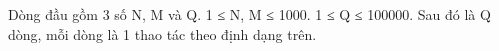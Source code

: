 Dòng đầu gồm 3 số N, M và Q. 1 ≤ N, M ≤ 1000. 1 ≤ Q ≤ 100000. Sau đó là Q dòng, mỗi dòng là 1 thao tác theo định dạng trên.
